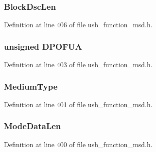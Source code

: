 \subsubsection[{Block\+Dsc\+Len}]{ Block\+Dsc\+Len}\label{structt_mode_param_hdr_a55db6651f8b8fe6d340edd391421731c}


Definition at line 406 of file usb\+\_\+function\+\_\+msd.\+h.

\hypertarget{structt_mode_param_hdr_a1f787a59551188f4302d096856a3e672}{}
\subsubsection[{D\+P\+O\+F\+U\+A}]{\setlength{\rightskip}{0pt plus 5cm}unsigned D\+P\+O\+F\+U\+A}\label{structt_mode_param_hdr_a1f787a59551188f4302d096856a3e672}


Definition at line 403 of file usb\+\_\+function\+\_\+msd.\+h.

\hypertarget{structt_mode_param_hdr_a64e8adf5ffc6c60ac18b418c33eefac8}{}
\subsubsection[{Medium\+Type}]{ Medium\+Type}\label{structt_mode_param_hdr_a64e8adf5ffc6c60ac18b418c33eefac8}


Definition at line 401 of file usb\+\_\+function\+\_\+msd.\+h.

\hypertarget{structt_mode_param_hdr_a7b658fec073f717fe927dd42f7879d77}{}
\subsubsection[{Mode\+Data\+Len}]{ Mode\+Data\+Len}\label{structt_mode_param_hdr_a7b658fec073f717fe927dd42f7879d77}


Definition at line 400 of file usb\+\_\+function\+\_\+msd.\+h.

\hypertarget{structt_mode_param_hdr_af096e8912c28affc9fddd1e352670b45}{}
